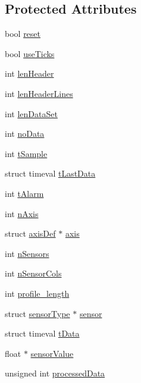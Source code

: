 \subsection*{Protected Attributes}
\begin{DoxyCompactItemize}
\item 
bool \hyperlink{classDAQDevice_ad9f21827cf4471e11b5e5bfe8f29152f}{reset}
\item 
bool \hyperlink{classDAQDevice_a6103f8804ccb23ac0e76e38ed954ddbc}{use\-Ticks}
\item 
int \hyperlink{classDAQDevice_a91b1652c6ca593eaf3f04e3118cd2420}{len\-Header}
\item 
int \hyperlink{classDAQDevice_a155e6dba34521962283c83f1bda63799}{len\-Header\-Lines}
\item 
int \hyperlink{classDAQDevice_ae6cf89824f15528d92fe1e31b2dacf59}{len\-Data\-Set}
\item 
int \hyperlink{classDAQDevice_af1607d0a9cdd02c6dfe9a7db01fbe4e8}{no\-Data}
\item 
int \hyperlink{classDAQDevice_aae80d100e6407da492b7bda911739bb8}{t\-Sample}
\item 
struct timeval \hyperlink{classDAQDevice_a7c0d73d39b13231c2760b0aa6724b42c}{t\-Last\-Data}
\item 
int \hyperlink{classDAQDevice_a508ad6a95eec7efc47047b056f145a9d}{t\-Alarm}
\item 
int \hyperlink{classDAQDevice_a9e0cb352d0412ec6cc600cc86aee69b8}{n\-Axis}
\item 
struct \hyperlink{structaxisDef}{axis\-Def} $\ast$ \hyperlink{classDAQDevice_ad4d9fa4d5ec7b391260d89393ed13a37}{axis}
\item 
int \hyperlink{classDAQDevice_a66af3e902896059a53f5cfb2fa04e0f5}{n\-Sensors}
\item 
int \hyperlink{classDAQDevice_a308e077b2ecaff2aa04e3dec7387751a}{n\-Sensor\-Cols}
\item 
int \hyperlink{classDAQDevice_a5da19e281fb55786ad815c0d98a0c616}{profile\-\_\-length}
\item 
struct \hyperlink{structsensorType}{sensor\-Type} $\ast$ \hyperlink{classDAQDevice_a62c5391079563bbd24ac2f7cdd210710}{sensor}
\item 
struct timeval \hyperlink{classDAQDevice_af7da14a199a793fd63db3af2b2a78d92}{t\-Data}
\item 
float $\ast$ \hyperlink{classDAQDevice_ad148188c57598fdf4fd4c1c333aeb0d8}{sensor\-Value}
\item 
unsigned int \hyperlink{classDAQDevice_a4ba9ed1e61cf39c3e3eab37e8cfc908c}{processed\-Data}

\end{DoxyCompactItemize}

